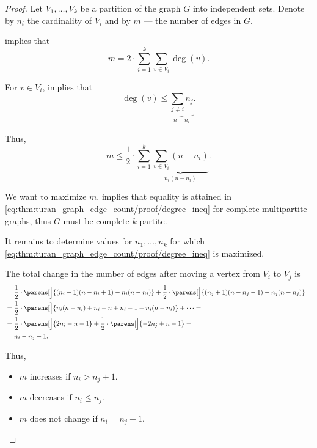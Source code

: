 \begin{proof}
  Let \( V_1, \ldots, V_k \) be a partition of the graph \( G \) into independent sets. Denote by \( n_i \) the cardinality of \( V_i \) and by \( m \) --- the number of edges in \( G \).

   implies that
  \begin{equation*}
    m = 2 \cdot \sum_{i=1}^k \sum_{v \in V_i} \deg(v).
  \end{equation*}

  For \( v \in V_i \),  implies that
  \begin{equation*}
    \deg(v) \leq \underbrace{\sum_{j \neq i} n_j}_{n - n_i}.
  \end{equation*}

  Thus,
  \begin{equation}\label{eq:thm:turan_graph_edge_count/proof/degree_ineq}
    m \leq \frac 1 2 \cdot \sum_{i=1}^k \underbrace{\sum_{v \in V_i} (n - n_i)}_{n_i (n - n_i)}.
  \end{equation}

  We want to maximize \( m \).  implies that equality is attained in \eqref{eq:thm:turan_graph_edge_count/proof/degree_ineq} for complete multipartite graphs, thus \( G \) must be complete \( k \)-partite.

  It remains to determine values for \( n_1, \ldots, n_k \) for which \eqref{eq:thm:turan_graph_edge_count/proof/degree_ineq} is maximized.

  The total change in the number of edges after moving a vertex from \( V_i \) to \( V_j \) is
  \begin{align*}
    &\phantom{{}={}}
    \frac 1 2 \cdot \parens[\Big]{ (n_i - 1)(n - n_i + 1) - n_i(n - n_i) } + \frac 1 2 \cdot \parens[\Big]{ (n_j + 1)(n - n_j - 1) - n_j(n - n_j) }
    = \\ &=
    \frac 1 2 \cdot \parens[\Big]{ n_i(n - n_i) + n_i - n + n_i - 1 - n_i(n - n_i) } + \cdots
    = \\ &=
    \frac 1 2 \cdot \parens[\Big]{ 2n_i - n - 1 } + \frac 1 2 \cdot \parens[\Big]{ -2n_j + n - 1 }
    = \\ &=
    n_i - n_j - 1.
  \end{align*}

  Thus,
  \begin{itemize}
    \item \( m \) increases if \( n_i > n_j + 1 \).
    \item \( m \) decreases if \( n_i \leq n_j \).
    \item \( m \) does not change if \( n_i = n_j + 1 \).
  \end{itemize}


\end{proof}
